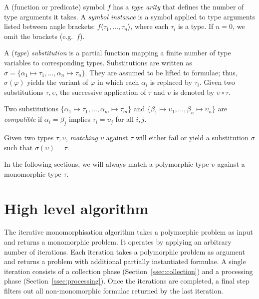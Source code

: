 \documentclass[]{ceurart}
\begin{document}
\begin{definition}%
A (function or predicate) {symbol} \(f\) has a \emph{type arity} that defines the number of type arguments it takes. A \emph{symbol instance} is a symbol applied to type arguments listed between angle brackets: \(f\langle \tau_1, \dots, \tau_n\rangle\), where each $\tau_i$ is a type. If $n = 0$, we omit the brackets (e.g.\ $f$).
\end{definition}

\begin{definition}
A (\emph{type}) \emph{substitution} is a partial function mapping a finite number of type variables to corresponding types. Substitutions are written as
$\sigma = \{\alpha_1\mapsto\tau_1, \dots, \alpha_n\mapsto\tau_n\}$. They are assumed to be lifted to formulae; thus, $\sigma(\varphi)$ yields the variant of $\varphi$ in which each $\alpha_i$ is replaced by $\tau_i$.
Given two substitutions \(\tau, \upsilon\), the successive application of \(\tau\) and \(\upsilon\) is denoted by \(\upsilon \circ \tau\).
\end{definition}

\begin{definition}
Two substitutions \(\{\alpha_1 \mapsto \tau_1, \dots, \alpha_m\mapsto\tau_m\}\) and \(\{\beta_1 \mapsto \upsilon_1, \dots, \beta_n\mapsto\upsilon_n\}\) are \emph{compatible} if \(\alpha_i = \beta_j\) implies \(\tau_i = \upsilon_j\) for all \(i, j\).
\end{definition}


\begin{definition}
Given two types \(\tau, \upsilon\), \emph{matching} \(\upsilon\) against \(\tau\) will either fail or yield a substitution \(\sigma\) such that \(\sigma(\upsilon) = \tau\).
\end{definition}

In the following sections, we will always match a polymorphic type $\upsilon$ against a monomorphic type $\tau$.

\section{High level algorithm}
\label{sec:high-level-algorithm}

The iterative monomorphisation algorithm takes a polymorphic problem as input and returns a monomorphic problem. It operates by applying an arbitrary number of iterations. Each iteration takes a polymorphic problem as argument and returns a problem with additional partially instantiated formulae. A single iteration consists of a collection phase (Section~\ref{ssec:collection}) and a processing phase (Section~\ref{ssec:processing}). Once the iterations are completed, a final step filters out all non-monomorphic formulae returned by the last iteration.
\end{document}
